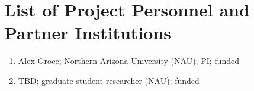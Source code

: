 \documentclass[12pt]{article}
\begin{document}
\begin{center}
{\large\sf\textbf{\proptitle}}
\end{center}

\section*{List of Project Personnel and Partner Institutions}

\begin{enumerate}
  \item Alex Groce;  Northern Arizona University (NAU); PI; funded
  \item TBD; graduate student researcher (NAU); funded
  
\end{enumerate}
\end{document}
